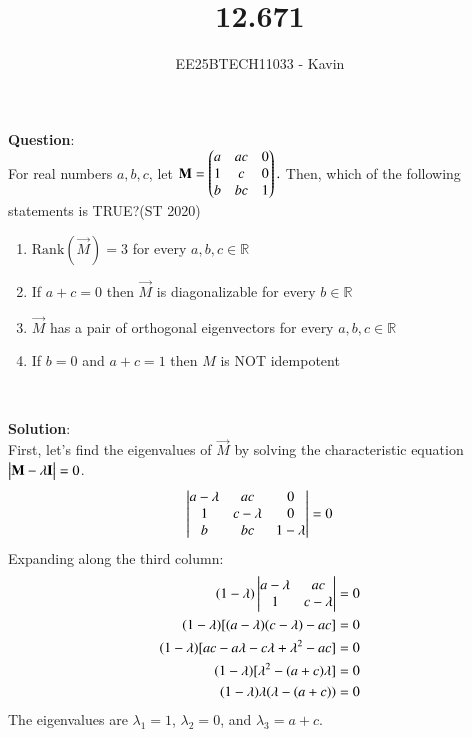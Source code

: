 \documentclass[journal]{IEEEtran}
\begin{document}

\vspace{3cm}

\title{12.671}
\author{EE25BTECH11033 - Kavin}
{\let\newpage\relax\maketitle}

\renewcommand{\thefigure}{\theenumi}
\renewcommand{\thetable}{\theenumi}
\setlength{\intextsep}{10pt} %
\textbf{Question}:\\
For real numbers $a, b, c$, let 
$\mathbf{M} = \begin{pmatrix}
a & ac & 0 \\
1 & c  & 0 \\
b & bc & 1\end{pmatrix}.$
Then, which of the following statements is {TRUE}?\hfill {(ST 2020)}
\begin{enumerate}
\item $\text{Rank}(\vec{M}) = 3$ for every $a,b,c \in \mathbb{R}$
\item If $a+c=0$ then $\vec{M}$ is diagonalizable for every $b \in \mathbb{R}$
\item $\vec{M}$ has a pair of orthogonal eigenvectors for every $a,b,c \in \mathbb{R}$
\item If $b=0$ and $a+c=1$ then $M$ is {NOT} idempotent
\end{enumerate}\\    
\bigskip

\textbf{Solution}:\\
First, let's find the eigenvalues of $\vec{M}$ by solving the characteristic equation $\begin{vmatrix}\mathbf{M} - \lambda \mathbf{I}\end{vmatrix} = 0$.
\begin{align}  
\begin{mydet}{ a-\lambda & ac & 0 \\ 1 & c-\lambda & 0 \\ b & bc & 1-\lambda }\end{mydet} = 0 
\end{align}
Expanding along the third column:
\begin{align*}
(1-\lambda) \begin{mydet}{ a-\lambda & ac \\ 1 & c-\lambda }\end{mydet} &= 0 \\
(1-\lambda) [(a-\lambda)(c-\lambda) - ac] &= 0 \\
(1-\lambda) [ac - a\lambda - c\lambda + \lambda^2 - ac] &= 0 \\
(1-\lambda) [\lambda^2 - (a+c)\lambda] &= 0 \\
(1-\lambda) \lambda (\lambda - (a+c)) &= 0
\end{align*}
The eigenvalues are $\lambda_1 = 1$, $\lambda_2 = 0$, and $\lambda_3 = a+c$.\\
\bigskip
\end{document}
